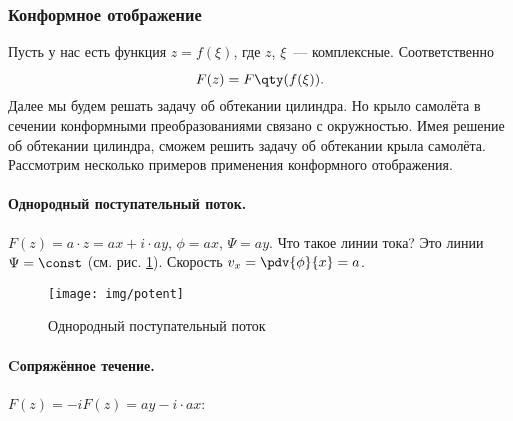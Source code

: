\subsubsection{Конформное отображение}
Пусть у нас есть функция
	$z=f(\xi)$, где $z$, $\xi$~--- комплексные. Соответственно
\begin{equation}
	F(z)=F\qty(\vphantom{\vec{b}}f(\xi)).
\end{equation}
Далее мы будем решать задачу об обтекании цилиндра. Но крыло самолёта в сечении конформными преобразованиями связано с
окружностью. Имея  решение об обтекании цилиндра, сможем решить задачу об обтекании крыла самолёта. Рассмотрим несколько примеров применения конформного отображения.

\paragraph{Однородный поступательный поток.} $F(z)=a\cdot z=ax+i\cdot ay$, $\phi=ax$, $\Psi=ay$. Что такое линии тока? Это линии $\Psi=\const$ (см. рис. \ref{fig:odnopotok}). Скорость $v_x=\pdv{\phi}{x}=a$.

\begin{figure}[ht!]
    \centering
    \texttt{[image: img/potent]}
    \caption{Однородный поступательный поток}
    \label{fig:odnopotok}
\end{figure}





\paragraph{Cопряжённое течение.} $F(z)=-iF(z)=ay - i\cdot ax$:

